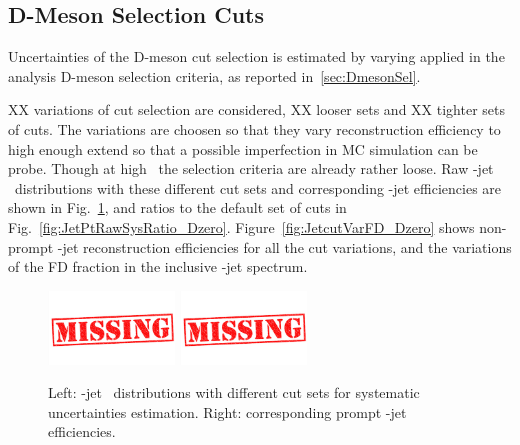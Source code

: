 \subsection{D-Meson Selection Cuts}
Uncertainties of the D-meson cut selection is estimated by varying applied in the analysis D-meson selection criteria, as reported in~\ref{sec:DmesonSel}. 

{\color{red} XX} variations of cut selection are considered, {\color{red} XX} looser sets and {\color{red} XX} tighter sets of cuts. The variations are choosen so that they vary \Dzero reconstruction efficiency to high enough extend so that a possible imperfection in MC simulation can be probe. Though at high \ptd\ the selection criteria are already rather loose.
Raw \Dzero-jet \pt\ distributions with these different cut sets and corresponding \Dzero-jet efficiencies are shown in Fig.~\ref{fig:JetPtRawSys_Dzero}, and ratios to the default set of cuts in Fig.~\ref{fig:JetPtRawSysRatio_Dzero}.
Figure~\ref{fig:JetcutVarFD_Dzero} shows non-prompt \Dzero-jet reconstruction efficiencies for all the cut variations, and the variations of the FD fraction in the inclusive \Dzero-jet spectrum.

\begin{figure}[bth]
\begin{center}
\includegraphics[width=0.3\textwidth]{missing}
\includegraphics[width=0.3\textwidth]{missing}
\caption{Left: \Dzero-jet \pt\ distributions with different cut sets for systematic uncertainties estimation. Right: corresponding prompt \Dzero-jet efficiencies.} 
\label{fig:JetPtRawSys_Dzero}
\end{center}
\end{figure}

